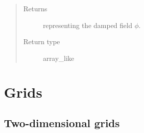 \documentclass[letterpaper,10pt,english]{sphinxmanual}
\begin{document}
\begin{fulllineitems}
\begin{fulllineitems}
\begin{quote}
\begin{description}
\begin{itemize}
\end{itemize}

\item[{Returns}] \leavevmode
{} representing the damped field \(\phi\).

\item[{Return type}] \leavevmode
array\_like

\end{description}\end{quote}

\end{fulllineitems}


\end{fulllineitems}



\section{Grids}
\label{\detokenize{api:grids}}

\subsection{Two-dimensional grids}
\label{\detokenize{api:two-dimensional-grids}}
\end{document}
